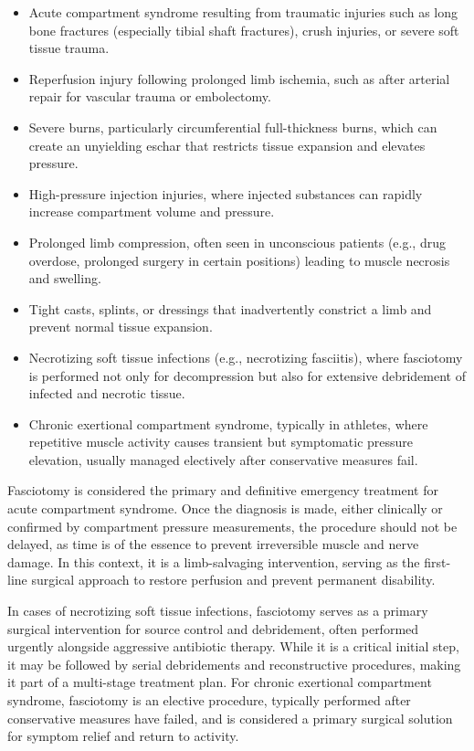 \begin{itemize}
  \item Acute compartment syndrome resulting from traumatic injuries such as long bone fractures (especially tibial shaft fractures), crush injuries, or severe soft tissue trauma.
  \item Reperfusion injury following prolonged limb ischemia, such as after arterial repair for vascular trauma or embolectomy.
  \item Severe burns, particularly circumferential full-thickness burns, which can create an unyielding eschar that restricts tissue expansion and elevates pressure.
  \item High-pressure injection injuries, where injected substances can rapidly increase compartment volume and pressure.
  \item Prolonged limb compression, often seen in unconscious patients (e.g., drug overdose, prolonged surgery in certain positions) leading to muscle necrosis and swelling.
  \item Tight casts, splints, or dressings that inadvertently constrict a limb and prevent normal tissue expansion.
  \item Necrotizing soft tissue infections (e.g., necrotizing fasciitis), where fasciotomy is performed not only for decompression but also for extensive debridement of infected and necrotic tissue.
  \item Chronic exertional compartment syndrome, typically in athletes, where repetitive muscle activity causes transient but symptomatic pressure elevation, usually managed electively after conservative measures fail.
\end{itemize}

Fasciotomy is considered the primary and definitive emergency treatment for acute compartment syndrome. Once the diagnosis is made, either clinically or confirmed by compartment pressure measurements, the procedure should not be delayed, as time is of the essence to prevent irreversible muscle and nerve damage. In this context, it is a limb-salvaging intervention, serving as the first-line surgical approach to restore perfusion and prevent permanent disability.

In cases of necrotizing soft tissue infections, fasciotomy serves as a primary surgical intervention for source control and debridement, often performed urgently alongside aggressive antibiotic therapy. While it is a critical initial step, it may be followed by serial debridements and reconstructive procedures, making it part of a multi-stage treatment plan. For chronic exertional compartment syndrome, fasciotomy is an elective procedure, typically performed after conservative measures have failed, and is considered a primary surgical solution for symptom relief and return to activity.

